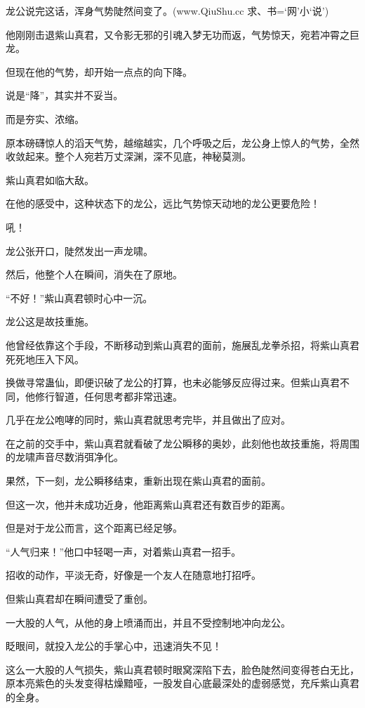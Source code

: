 
\begin{this_body}

龙公说完这话，浑身气势陡然间变了。(www.QiuShu.cc 求、书=‘网’小‘说’)

他刚刚击退紫山真君，又令影无邪的引魂入梦无功而返，气势惊天，宛若冲霄之巨龙。

但现在他的气势，却开始一点点的向下降。

说是“降”，其实并不妥当。

而是夯实、浓缩。

原本磅礴惊人的滔天气势，越缩越实，几个呼吸之后，龙公身上惊人的气势，全然收敛起来。整个人宛若万丈深渊，深不见底，神秘莫测。

紫山真君如临大敌。

在他的感受中，这种状态下的龙公，远比气势惊天动地的龙公更要危险！

吼！

龙公张开口，陡然发出一声龙啸。

然后，他整个人在瞬间，消失在了原地。

“不好！”紫山真君顿时心中一沉。

龙公这是故技重施。

他曾经依靠这个手段，不断移动到紫山真君的面前，施展乱龙拳杀招，将紫山真君死死地压入下风。

换做寻常蛊仙，即便识破了龙公的打算，也未必能够反应得过来。但紫山真君不同，他修行智道，任何思考都非常迅速。

几乎在龙公咆哮的同时，紫山真君就思考完毕，并且做出了应对。

在之前的交手中，紫山真君就看破了龙公瞬移的奥妙，此刻他也故技重施，将周围的龙啸声音尽数消弭净化。

果然，下一刻，龙公瞬移结束，重新出现在紫山真君的面前。

但这一次，他并未成功近身，他距离紫山真君还有数百步的距离。

但是对于龙公而言，这个距离已经足够。

“人气归来！”他口中轻喝一声，对着紫山真君一招手。

招收的动作，平淡无奇，好像是一个友人在随意地打招呼。

但紫山真君却在瞬间遭受了重创。

一大股的人气，从他的身上喷涌而出，并且不受控制地冲向龙公。

眨眼间，就投入龙公的手掌心中，迅速消失不见！

这么一大股的人气损失，紫山真君顿时眼窝深陷下去，脸色陡然间变得苍白无比，原本亮紫色的头发变得枯燥黯哑，一股发自心底最深处的虚弱感觉，充斥紫山真君的全身。


\end{this_body}
